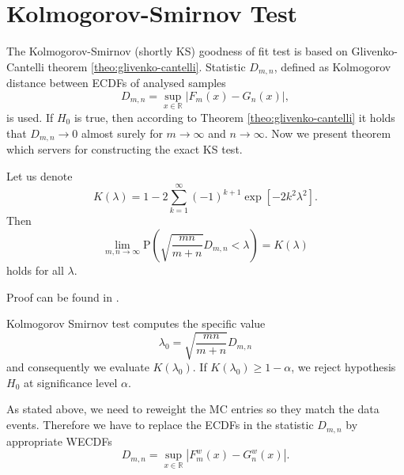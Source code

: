 \section{Kolmogorov-Smirnov Test}
The Kolmogorov-Smirnov (shortly KS)  goodness of fit test is based on Glivenko-Cantelli theorem \ref{theo:glivenko-cantelli}. Statistic $D_{m,n}$, defined as Kolmogorov distance between ECDFs of analysed samples
\begin{equation}
D_{m,n} = \sup_{x \in \mathbb{R}} |F_m(x) - G_n(x)|,
\label{eq:KSstat}
\end{equation}
is used. If $H_0$ is true, then according to Theorem \ref{theo:glivenko-cantelli} it holds that $D_{m,n} \rightarrow 0$ almost surely for $m \rightarrow \infty$ and $n \rightarrow \infty$. Now we present theorem which servers for constructing the exact KS test.
\begin{theorem}[Smirnov]
	Let us denote  
	\begin{equation}
	K(\lambda) = 1 - 2\sum_{k=1}^{\infty} (-1)^{k+1} \exp\left[ -2k^2\lambda^2\right].
	\end{equation}
	Then 
	\begin{equation}
	\lim_{m,n \rightarrow \infty} \mathrm{P}\left(\sqrt{\frac{mn}{m+n}}D_{m,n} < \lambda \right) = K(\lambda)
	\end{equation}
	holds for all $\lambda$.
\end{theorem}
\noindent Proof can be found in \cite{Smirnov1944}. 

\noindent Kolmogorov Smirnov test computes the specific value
\[\lambda_0 = \sqrt{\frac{mn}{m+n}}D_{m,n}\] and consequently we evaluate  $K\left( \lambda_0 \right)$. If $K\left( \lambda_0 \right) \geq 1 - \alpha$, we reject hypothesis $H_0$ at significance level $\alpha$.

As stated above, we need to reweight the MC entries so they match the data events. Therefore we have to replace the ECDFs in the statistic $D_{m,n}$ by appropriate WECDFs
\begin{equation}
D_{m,n} = \sup_{x \in \mathbb{R}} |F^w_m(x) - G^w_n(x)|.
\end{equation}



